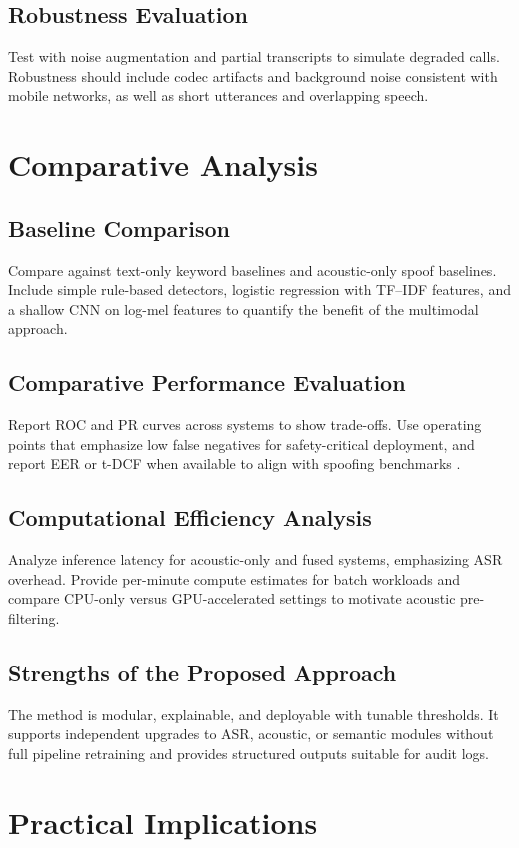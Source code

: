\documentclass[11pt,a4paper]{article}
\begin{document}
\subsection{Robustness Evaluation}
Test with noise augmentation and partial transcripts to simulate degraded calls. Robustness should include codec artifacts and background noise consistent with mobile networks, as well as short utterances and overlapping speech.

\section{Comparative Analysis}
\subsection{Baseline Comparison}
Compare against text-only keyword baselines and acoustic-only spoof baselines. Include simple rule-based detectors, logistic regression with TF--IDF features, and a shallow CNN on log-mel features to quantify the benefit of the multimodal approach.

\subsection{Comparative Performance Evaluation}
Report ROC and PR curves across systems to show trade-offs. Use operating points that emphasize low false negatives for safety-critical deployment, and report EER or t-DCF when available to align with spoofing benchmarks \cite{asvspoof2019}.

\subsection{Computational Efficiency Analysis}
Analyze inference latency for acoustic-only and fused systems, emphasizing ASR overhead. Provide per-minute compute estimates for batch workloads and compare CPU-only versus GPU-accelerated settings to motivate acoustic pre-filtering.

\subsection{Strengths of the Proposed Approach}
The method is modular, explainable, and deployable with tunable thresholds. It supports independent upgrades to ASR, acoustic, or semantic modules without full pipeline retraining and provides structured outputs suitable for audit logs.

\section{Practical Implications}
\end{document}
